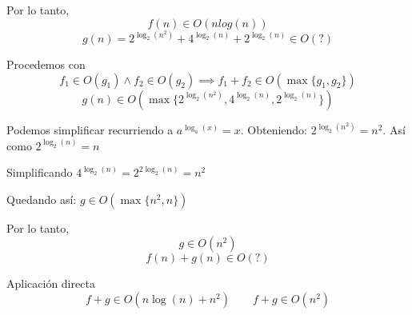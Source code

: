 \documentclass{article}
\begin{document}
	Por lo tanto, \[ f(n) \in O(nlog(n))\]
	{\LARGE
	\begin{displaymath}
		g(n) = 2^{\log_2 (n^2)} + 4^{\log_2 (n)} + 2^{\log_2 (n)} \in O(?)
	\end{displaymath}
	}
	
	Procedemos con
	\[
		f_1 \in O(g_1) \land f_2 \in O(g_2) \implies f_1 + f_2 \in O(\max \{g_1, g_2\})
	\]
	\[
		g(n) \in O(\max \{2^{\log_2 (n^2)}, 4^{\log_2 (n)}, 2^{\log_2 (n)}\})
	\]
	
	Podemos simplificar recurriendo a $a^{\log_a (x)} = x$. Obteniendo: $2^{\log_2 (n^2)} = n^2$. Así como $2^{\log_2(n)} = n$
	
	Simplificando $4^{\log_2 (n)} = 2^{2\log_2 (n)} = n^2$
	
	Quedando así: $g \in O(\max \{ n^2, n \})$
	
	Por lo tanto,
	\[
		g \in O(n^2)
	\]
	{\LARGE
	\begin{displaymath}
		f (n) + g(n) \in O(?)
	\end{displaymath}
	}

	Aplicación directa
	\[
		f + g \in O(n \log(n) + n^2) \qquad f + g \in O(n^2)
	\]
\end{document}
